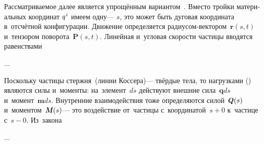 

\begin{otherlanguage}{russian}

Рассматриваемое далее является упрощённым вариантом~. Вместо тройки материальных координат ${q^{\hspace{.1ex}i}}$ имеем одну\:--- $s$, это может быть дуговая координата в~отсчётной конфигурации. Движение определяется радиусом-вектором~${\bm{r}(s,t)}$ и~тензором поворота~${\bm{P}(s,t)}$. Линейная и~угловая скорости частицы вводятся равенствами

...



\end{otherlanguage}



\begin{otherlanguage}{russian}

Поскольку частицы стержня~(линии Коссера)\:--- твёрдые тела, то нагрузками () являются силы и~моменты: на~элемент~$ds$ действуют внешние сила~${\bm{q}ds}$ и~момент~${\bm{m}ds}$. Внутренние взаимо\-действия тоже определяются силой~${\mathboldQ \hspace{.1ex} (s)}$ и~моментом~${\mathboldM \hspace{.1ex} (s)}$\:--- это воздействие от~частицы с~координатой~${s\!+\!0}$ к~частице с~${s\!-\!0}$. Из~закона

...



\end{otherlanguage}

